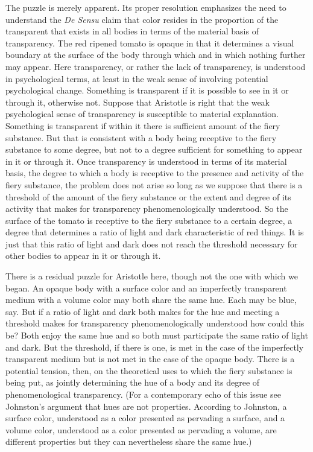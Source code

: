 The puzzle is merely apparent. Its proper resolution emphasizes the need to understand the \emph{De Sensu} claim that color resides in the proportion of the transparent that exists in all bodies in terms of the material basis of transparency. The red ripened tomato is opaque in that it determines a visual boundary at the surface of the body through which and in which nothing further may appear. Here transparency, or rather the lack of transparency, is understood in psychological terms, at least in the weak sense of involving potential psychological change. Something is transparent if it is possible to see in it or through it, otherwise not. Suppose that Aristotle is right that the weak psychological sense of transparency is susceptible to material explanation. Something is transparent if within it there is sufficient amount of the fiery substance. But that is consistent with a body being receptive to the fiery substance to some degree, but not to a degree sufficient for something to appear in it or through it. Once transparency is understood in terms of its material basis, the degree to which a body is receptive to the presence and activity of the fiery substance, the problem does not arise so long as we suppose that there is a threshold of the amount of the fiery substance or the extent and degree of its activity that makes for transparency phenomenologically understood. So the surface of the tomato is receptive to the fiery substance to a certain degree, a degree that determines a ratio of light and dark characteristic of red things. It is just that this ratio of light and dark does not reach the threshold necessary for other bodies to appear in it or through it.

There is a residual puzzle for Aristotle here, though not the one with which we began. An opaque body with a surface color and an imperfectly transparent medium with a volume color may both share the same hue. Each may be blue, say. But if a ratio of light and dark both makes for the hue and meeting a threshold makes for transparency phenomenologically understood how could this be? Both enjoy the same hue and so both must participate the same ratio of light and dark. But the threshold, if there is one, is met in the case of the imperfectly transparent medium but is not met in the case of the opaque body. There is a potential tension, then, on the theoretical uses to which the fiery substance is being put, as jointly determining the hue of a body and its degree of phenomenological transparency. (For a contemporary echo of this issue see Johnston's \citeyear[263]{Johnston:2007qy} argument that hues are not properties. According to Johnston, a surface color, understood as a color presented as pervading a surface, and a volume color, understood as a color presented as pervading a volume, are different properties but they can nevertheless share the same hue.)


